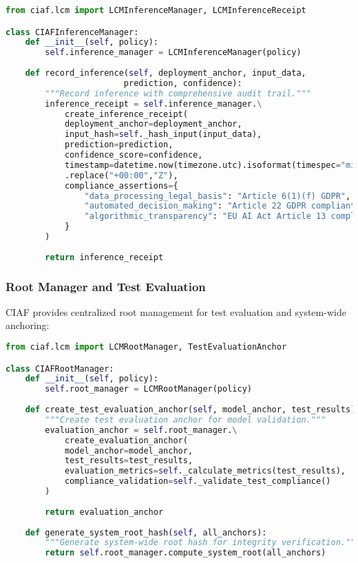 \documentclass[12pt,a4paper]{article}
\begin{document}
\begin{lstlisting}[language=Python, caption=Inference Manager Implementation]
from ciaf.lcm import LCMInferenceManager, LCMInferenceReceipt

class CIAFInferenceManager:
    def __init__(self, policy):
        self.inference_manager = LCMInferenceManager(policy)
        
    def record_inference(self, deployment_anchor, input_data, 
                        prediction, confidence):
        """Record inference with comprehensive audit trail."""
        inference_receipt = self.inference_manager.\
            create_inference_receipt(
            deployment_anchor=deployment_anchor,
            input_hash=self._hash_input(input_data),
            prediction=prediction,
            confidence_score=confidence,
            timestamp=datetime.now(timezone.utc).isoformat(timespec="microseconds")
            .replace("+00:00","Z"),
            compliance_assertions={
                "data_processing_legal_basis": "Article 6(1)(f) GDPR",
                "automated_decision_making": "Article 22 GDPR compliant",
                "algorithmic_transparency": "EU AI Act Article 13 compliant"
            }
        )
        
        return inference_receipt
\end{lstlisting}

\subsubsection{Root Manager and Test Evaluation}

CIAF provides centralized root management for test evaluation and system-wide anchoring:

\begin{lstlisting}[language=Python, caption=Root Manager Implementation]
from ciaf.lcm import LCMRootManager, TestEvaluationAnchor

class CIAFRootManager:
    def __init__(self, policy):
        self.root_manager = LCMRootManager(policy)
        
    def create_test_evaluation_anchor(self, model_anchor, test_results):
        """Create test evaluation anchor for model validation."""
        evaluation_anchor = self.root_manager.\
            create_evaluation_anchor(
            model_anchor=model_anchor,
            test_results=test_results,
            evaluation_metrics=self._calculate_metrics(test_results),
            compliance_validation=self._validate_test_compliance()
        )
        
        return evaluation_anchor
    
    def generate_system_root_hash(self, all_anchors):
        """Generate system-wide root hash for integrity verification."""
        return self.root_manager.compute_system_root(all_anchors)
\end{lstlisting}
\end{document}
